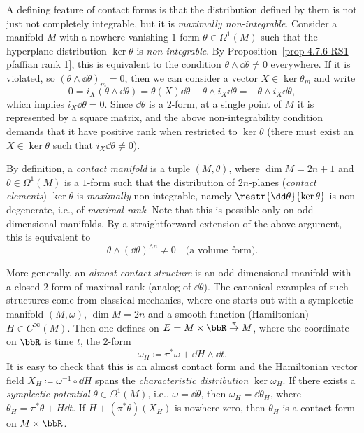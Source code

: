 \begin{rem}
    A defining feature of contact forms is that the distribution defined by them is not just not completely integrable, but it is \emph{maximally non-integrable}. Consider a manifold $M$ with a nowhere-vanishing $1$-form $\theta\in\Omega^1(M)$ such that the hyperplane distribution $\ker\theta$ is \emph{non-integrable}. By Proposition~\ref{prop 4.7.6 RS1 pfaffian rank 1}, this is equivalent to the condition $\theta\wedge\dd\theta\neq 0$
    everywhere. If it is violated, so $(\theta\wedge\dd\theta)_m=0$, then we can consider a vector $X\in\ker\theta_m$ and write 
    \[0=i_X(\theta\wedge\dd\theta)=\theta(X)\dd\theta-\theta\wedge i_X\dd\theta=-\theta\wedge i_X\dd\theta,\]
    which implies $i_X\dd\theta=0$. Since $\dd\theta$ is a $2$-form, at a single point of $M$ it is represented by a square matrix, and the above non-integrability condition demands that it have positive rank when restricted to $\ker\theta$ (there must exist an $X\in \ker\theta$ such that $i_X\dd\theta\neq 0$).  
    
    By definition, a \emph{contact manifold}  is a tuple $(M,\theta)$, where $\dim M=2n+1$ and $\theta\in\Omega^1(M)$ is a $1$-form such that the distribution of $2n$-planes (\emph{contact elements}) $\ker\theta$ is \emph{maximally} non-integrable, namely $\restr{\dd\theta}{\ker\theta}$ is non-degenerate, i.e., of \emph{maximal rank}. Note that this is possible only on odd-dimensional manifolds. By a straightforward extension of the above argument, this is equivalent to 
    \[\theta\wedge(\dd\theta)^{\wedge n}\neq 0 \quad \text{(a volume form)}.\]
    
    More generally, an \emph{almost contact structure} is an odd-dimensional manifold with a closed $2$-form of maximal rank (analog of $\dd\theta$). The canonical examples of such structures come from classical mechanics, where one starts out with a symplectic manifold $(M,\omega)$, $\dim M=2n$ and a smooth function (Hamiltonian) $H\in C^\infty(M)$. Then one defines on $E=M\times \bbR\overset{\pi}{\to}M$, where the coordinate on $\bbR$ is time $t$, the $2$-form
    \[\omega_H\coloneqq \pi^\ast \omega+\dd H\wedge\dd t.\]
    It is easy to check that this is an almost contact form and the Hamiltonian vector field $X_H\coloneqq \omega^{-1}\circ \dd H$ spans the \emph{characteristic distribution} $\ker\omega_H$. If there exists a \emph{symplectic potential} $\theta\in \Omega^1(M)$, i.e., $\omega=\dd\theta$, then $\omega_H=\dd\theta_H$, where $\theta_H=\pi^\ast\theta+H\dd t$. If $H+(\pi^\ast\theta)(X_H)$ is nowhere zero, then $\theta_H$ is a contact form on $M\times \bbR$.
\end{rem}



